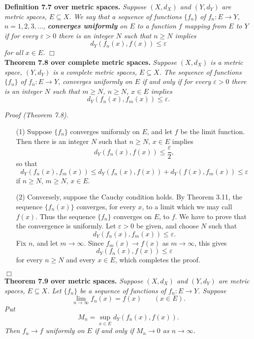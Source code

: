 \documentclass{article}
\begin{document}
\textbf{Definition 7.7 over metric spaces.}
\emph{Suppose $(X,d_X)$ and $(Y,d_Y)$ are metric spaces, $E \subseteq X$.
We say that a sequence of functions $\{f_n\}$ of $f_n: E \to Y$,
$n = 1,2,3,\ldots$,
\textbf{converges uniformly} on $E$ to a function $f$ mapping from $E$ to $Y$
if for every $\varepsilon > 0$ there is an integer $N$ such that $n \geq N$ implies
\[
  d_Y(f_n(x),f(x)) \leq \varepsilon
\]
for all $x \in E$.}
$\Box$ \\



\textbf{Theorem 7.8 over complete metric spaces.}
\emph{Suppose $(X,d_X)$ is a metric space,
$(Y,d_Y)$ is a complete metric spaces, $E \subseteq X$.
The sequence of functions $\{f_n\}$ of $f_n: E \to Y$,
converges uniformly on $E$ if and only if
for every $\varepsilon > 0$
there is an integer $N$ such that $m \geq N$, $n \geq N$, $x \in E$ implies}
\[
  d_Y(f_n(x),f_m(x)) \leq \varepsilon.
\]

\emph{Proof (Theorem 7.8).}
\begin{enumerate}
  \item[(1)]
  Suppose $\{f_n\}$ converges uniformly on $E$, and let $f$ be the limit function.
  Then there is an integer $N$ such that $n \geq N$, $x \in E$ implies
  \[
    d_Y(f_n(x),f(x)) \leq \frac{\varepsilon}{2},
  \]
  so that
  \[
    d_Y(f_n(x),f_m(x))
    \leq d_Y(f_n(x),f(x)) + d_Y(f(x),f_m(x))
    \leq \varepsilon
  \]
  if $n \geq N$, $m \geq N$, $x \in E$.

  \item[(2)]
  Conversely, suppose the Cauchy condition holds.
  By Theorem 3.11,
  the sequence $\{f_n(x)\}$ converges, for every $x$, to a limit which we may call $f(x)$.
  Thus the sequence $\{f_n\}$ converges on $E$, to $f$.
  We have to prove that the convergence is uniformly.
  Let $\varepsilon > 0$ be given, and choose $N$ such that
  \[
    d_Y(f_n(x),f_m(x)) \leq \varepsilon.
  \]
  Fix $n$, and let $m \to \infty$.
  Since $f_m(x) \to f(x)$ as $m \to \infty$, this gives
  \[
    d_Y(f_n(x),f(x)) \leq \varepsilon
  \]
  for every $n \geq N$ and every $x \in E$, which completes the proof.
\end{enumerate}
$\Box$ \\



\textbf{Theorem 7.9 over metric spaces.}
\emph{Suppose $(X,d_X)$ and $(Y,d_Y)$ are metric spaces, $E \subseteq X$.
Let $\{f_n\}$ be a sequence of functions of $f_n: E \to Y$.
Suppose
\[
  \lim_{n \to \infty}f_n(x) = f(x)
  \:\:\:\:\:\:\:\:
  (x \in E).
\]
Put
\[
  M_n = \sup_{x \in E} d_Y(f_n(x),f(x)).
\]
Then $f_n \to f$ uniformly on $E$ if and only if $M_n \to 0$ as $n \to \infty$.} \\
\end{document}
